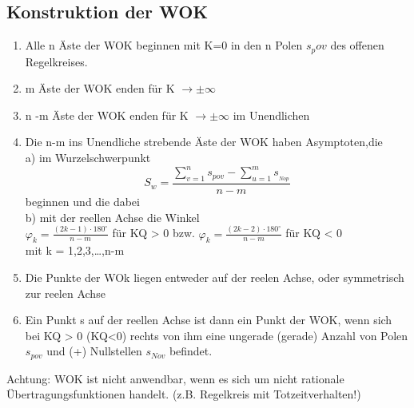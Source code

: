 \documentclass[10pt,a4paper]{article}
\begin{document}
  \subsection{Konstruktion der WOK}
  \begin{mdframed}[style=exercise]
      \begin{enumerate}
        \item Alle n Äste der WOK beginnen mit K=0 in den n Polen $s_pov$ des offenen Regelkreises.\\
        \item m Äste der WOK enden für K $\rightarrow \pm \infty$
        \item n -m Äste der WOK enden für K $\rightarrow \pm \infty$ im Unendlichen
        \item Die n-m ins Unendliche strebende Äste der WOK haben Asymptoten,die\\
            a) im Wurzelschwerpunkt
            \[S_{w}=\frac{\sum_{v=1}^{n} s_{pov}-\sum_{u=1}^{m} s_{_{Nop}}}{n-m}\]
            beginnen und die dabei\\
            b) mit der reellen Achse die Winkel\\
            $\varphi_{k}=\frac{(2 k-1) \cdot 180^{\circ}}{n-m}$ für KQ > 0 bzw.
            $\varphi_{k}=\frac{(2 k-2) \cdot 180^{\circ}}{n-m}$ für KQ < 0 \\
            mit k = 1,2,3,\dots,n-m
        \item Die Punkte der WOk liegen entweder auf der reelen Achse, oder symmetrisch zur reelen Achse
        \item Ein Punkt s auf der reellen Achse ist dann ein Punkt der WOK, wenn sich bei KQ > 0 (KQ<0)
            rechts von ihm eine ungerade (gerade) Anzahl von Polen $s_{pov}$ und (+) Nullstellen $s_{Nov}$ befindet.
\end{enumerate}
Achtung: WOK ist nicht anwendbar, wenn es sich um nicht rationale Übertragungsfunktionen handelt.
 (z.B. Regelkreis mit Totzeitverhalten!)
  \end{mdframed}
\end{document}
